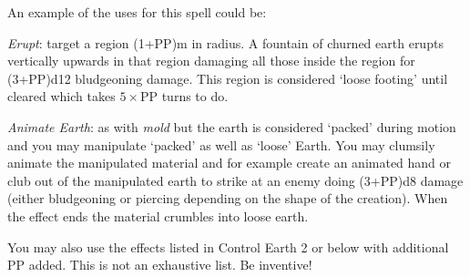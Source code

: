 \begin{multicols}{3}
{An example of the uses for this spell could be:
\begin{spellitemize}
\item {\it Erupt}: target a region (1+PP)m in radius. A fountain of churned earth erupts vertically upwards in that region\comma{} damaging all those inside the region for (3+PP)d12 bludgeoning damage. This region is considered `loose footing' until cleared\comma{} which takes $5 \times$PP turns to do. 
\item {\it Animate Earth}: as with {\it mold}\comma{} but the earth is considered `packed' during motion and you may manipulate `packed' as well as `loose' Earth. You may clumsily animate the manipulated material\comma{} and\comma{} for example\comma{} create an animated hand or club out of the manipulated earth to strike at an enemy\comma{} doing (3+PP)d8 damage (either bludgeoning or piercing\comma{} depending on the shape of the creation). When the effect ends\comma{} the material crumbles into loose earth. 
\end{spellitemize}
You may also use the effects listed in Control Earth 2 or below with \PPDifference{\DVAdp}{\DVNov} additional PP added. 
This is not an exhaustive list. Be inventive!}
\end{multicols}
